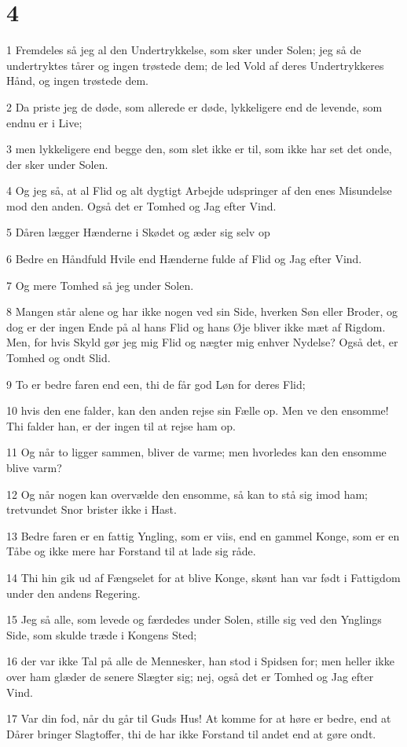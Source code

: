 \chapter{4}

\par 1 Fremdeles så jeg al den Undertrykkelse, som sker under Solen; jeg så de undertryktes tårer og ingen trøstede dem; de led Vold af deres Undertrykkeres Hånd, og ingen trøstede dem.
\par 2 Da priste jeg de døde, som allerede er døde, lykkeligere end de levende, som endnu er i Live;
\par 3 men lykkeligere end begge den, som slet ikke er til, som ikke har set det onde, der sker under Solen.
\par 4 Og jeg så, at al Flid og alt dygtigt Arbejde udspringer af den enes Misundelse mod den anden. Også det er Tomhed og Jag efter Vind.
\par 5 Dåren lægger Hænderne i Skødet og æder sig selv op
\par 6 Bedre en Håndfuld Hvile end Hænderne fulde af Flid og Jag efter Vind.
\par 7 Og mere Tomhed så jeg under Solen.
\par 8 Mangen står alene og har ikke nogen ved sin Side, hverken Søn eller Broder, og dog er der ingen Ende på al hans Flid og hans Øje bliver ikke mæt af Rigdom. Men, for hvis Skyld gør jeg mig Flid og nægter mig enhver Nydelse? Også det, er Tomhed og ondt Slid.
\par 9 To er bedre faren end een, thi de får god Løn for deres Flid;
\par 10 hvis den ene falder, kan den anden rejse sin Fælle op. Men ve den ensomme! Thi falder han, er der ingen til at rejse ham op.
\par 11 Og når to ligger sammen, bliver de varme; men hvorledes kan den ensomme blive varm?
\par 12 Og når nogen kan overvælde den ensomme, så kan to stå sig imod ham; tretvundet Snor brister ikke i Hast.
\par 13 Bedre faren er en fattig Yngling, som er viis, end en gammel Konge, som er en Tåbe og ikke mere har Forstand til at lade sig råde.
\par 14 Thi hin gik ud af Fængselet for at blive Konge, skønt han var født i Fattigdom under den andens Regering.
\par 15 Jeg så alle, som levede og færdedes under Solen, stille sig ved den Ynglings Side, som skulde træde i Kongens Sted;
\par 16 der var ikke Tal på alle de Mennesker, han stod i Spidsen for; men heller ikke over ham glæder de senere Slægter sig; nej, også det er Tomhed og Jag efter Vind.
\par 17 Var din fod, når du går til Guds Hus! At komme for at høre er bedre, end at Dårer bringer Slagtoffer, thi de har ikke Forstand til andet end at gøre ondt.


